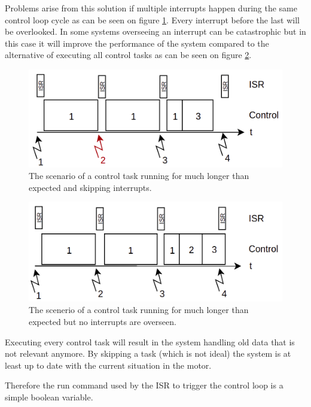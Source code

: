 Problems arise from this solution if multiple interrupts happen during the same control loop cycle as can be seen on figure \ref{fig:isr4}. Every interrupt before the last will be overlooked. In some systems overseeing an interrupt can be catastrophic but in this case it will improve the performance of the system compared to the alternative of executing all control tasks as can be seen on figure \ref{fig:isr3}.

\begin{figure}[H]
	\centering
	\includegraphics[width=0.65\linewidth]{pictures/software/isr/isr4.png}
	\caption{The scenario of a control task running for much longer than expected and skipping interrupts.}
	\label{fig:isr4}
\end{figure}

\begin{figure}[H]
	\centering
	\includegraphics[width=0.65\linewidth]{pictures/software/isr/isr3.png}
	\caption{The scenerio of a control task running for much longer than expected but no interrupts are overseen.}
	\label{fig:isr3}
\end{figure}


Executing every control task will result in the system handling old data that is not relevant anymore. By skipping a task (which is not ideal) the system is at least up to date with the current situation in the motor.

Therefore the run command used by the ISR to trigger the control loop is a simple boolean variable.